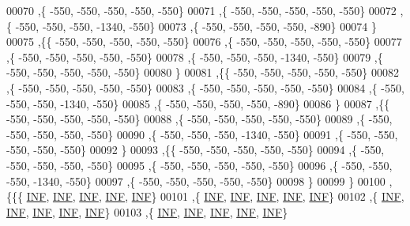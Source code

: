 \begin{DoxyCode}
00070   ,\{  -550,  -550,  -550,  -550,  -550\}
00071   ,\{  -550,  -550,  -550,  -550,  -550\}
00072   ,\{  -550,  -550,  -550, -1340,  -550\}
00073   ,\{  -550,  -550,  -550,  -550,  -890\}
00074   \}
00075  ,\{\{  -550,  -550,  -550,  -550,  -550\}
00076   ,\{  -550,  -550,  -550,  -550,  -550\}
00077   ,\{  -550,  -550,  -550,  -550,  -550\}
00078   ,\{  -550,  -550,  -550, -1340,  -550\}
00079   ,\{  -550,  -550,  -550,  -550,  -550\}
00080   \}
00081  ,\{\{  -550,  -550,  -550,  -550,  -550\}
00082   ,\{  -550,  -550,  -550,  -550,  -550\}
00083   ,\{  -550,  -550,  -550,  -550,  -550\}
00084   ,\{  -550,  -550,  -550, -1340,  -550\}
00085   ,\{  -550,  -550,  -550,  -550,  -890\}
00086   \}
00087  ,\{\{  -550,  -550,  -550,  -550,  -550\}
00088   ,\{  -550,  -550,  -550,  -550,  -550\}
00089   ,\{  -550,  -550,  -550,  -550,  -550\}
00090   ,\{  -550,  -550,  -550, -1340,  -550\}
00091   ,\{  -550,  -550,  -550,  -550,  -550\}
00092   \}
00093  ,\{\{  -550,  -550,  -550,  -550,  -550\}
00094   ,\{  -550,  -550,  -550,  -550,  -550\}
00095   ,\{  -550,  -550,  -550,  -550,  -550\}
00096   ,\{  -550,  -550,  -550, -1340,  -550\}
00097   ,\{  -550,  -550,  -550,  -550,  -550\}
00098   \}
00099  \}
00100 ,\{\{\{   \mbox{\hyperlink{1_88_84__epars_8h_a12c2040f25d8e3a7b9e1c2024c618cb6}{INF}},   \mbox{\hyperlink{1_88_84__epars_8h_a12c2040f25d8e3a7b9e1c2024c618cb6}{INF}},   \mbox{\hyperlink{1_88_84__epars_8h_a12c2040f25d8e3a7b9e1c2024c618cb6}{INF}},   \mbox{\hyperlink{1_88_84__epars_8h_a12c2040f25d8e3a7b9e1c2024c618cb6}{INF}},   \mbox{\hyperlink{1_88_84__epars_8h_a12c2040f25d8e3a7b9e1c2024c618cb6}{INF}}\}
00101   ,\{   \mbox{\hyperlink{1_88_84__epars_8h_a12c2040f25d8e3a7b9e1c2024c618cb6}{INF}},   \mbox{\hyperlink{1_88_84__epars_8h_a12c2040f25d8e3a7b9e1c2024c618cb6}{INF}},   \mbox{\hyperlink{1_88_84__epars_8h_a12c2040f25d8e3a7b9e1c2024c618cb6}{INF}},   \mbox{\hyperlink{1_88_84__epars_8h_a12c2040f25d8e3a7b9e1c2024c618cb6}{INF}},   \mbox{\hyperlink{1_88_84__epars_8h_a12c2040f25d8e3a7b9e1c2024c618cb6}{INF}}\}
00102   ,\{   \mbox{\hyperlink{1_88_84__epars_8h_a12c2040f25d8e3a7b9e1c2024c618cb6}{INF}},   \mbox{\hyperlink{1_88_84__epars_8h_a12c2040f25d8e3a7b9e1c2024c618cb6}{INF}},   \mbox{\hyperlink{1_88_84__epars_8h_a12c2040f25d8e3a7b9e1c2024c618cb6}{INF}},   \mbox{\hyperlink{1_88_84__epars_8h_a12c2040f25d8e3a7b9e1c2024c618cb6}{INF}},   \mbox{\hyperlink{1_88_84__epars_8h_a12c2040f25d8e3a7b9e1c2024c618cb6}{INF}}\}
00103   ,\{   \mbox{\hyperlink{1_88_84__epars_8h_a12c2040f25d8e3a7b9e1c2024c618cb6}{INF}},   \mbox{\hyperlink{1_88_84__epars_8h_a12c2040f25d8e3a7b9e1c2024c618cb6}{INF}},   \mbox{\hyperlink{1_88_84__epars_8h_a12c2040f25d8e3a7b9e1c2024c618cb6}{INF}},   \mbox{\hyperlink{1_88_84__epars_8h_a12c2040f25d8e3a7b9e1c2024c618cb6}{INF}},   \mbox{\hyperlink{1_88_84__epars_8h_a12c2040f25d8e3a7b9e1c2024c618cb6}{INF}}\}

\end{DoxyCode}
